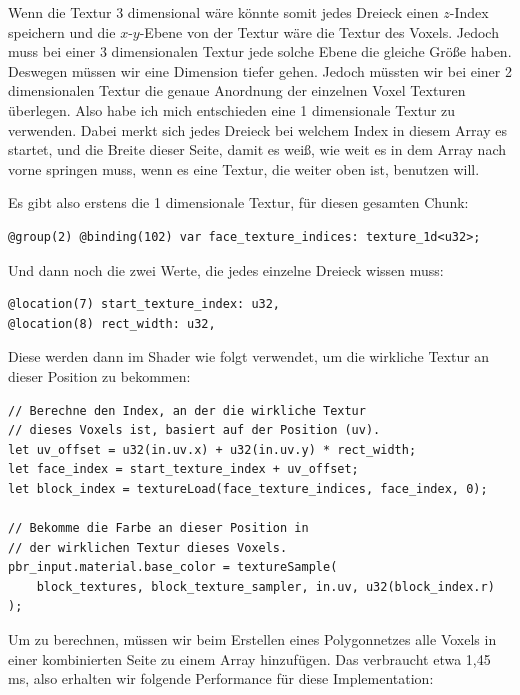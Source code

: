 Wenn die Textur 3 dimensional wäre könnte somit
jedes Dreieck einen $z$-Index speichern und die
$x$-$y$-Ebene von der Textur wäre die Textur des Voxels.
Jedoch muss bei einer 3 dimensionalen Textur jede
solche Ebene die gleiche Größe haben.
Deswegen müssen wir eine Dimension tiefer gehen.
Jedoch müssten wir bei einer 2 dimensionalen Textur
die genaue Anordnung der einzelnen Voxel Texturen
überlegen.
Also habe ich mich entschieden eine 1 dimensionale
Textur zu verwenden.
Dabei merkt sich jedes Dreieck bei welchem Index
in diesem Array es startet, und die Breite dieser
Seite, damit es weiß, wie weit es in dem Array nach
vorne springen muss, wenn es eine Textur, die weiter
oben ist, benutzen will.
 
Es gibt also erstens die 1 dimensionale Textur,
für diesen gesamten Chunk:

\begin{lstlisting}[language=WGSL]
@group(2) @binding(102) var face_texture_indices: texture_1d<u32>;
\end{lstlisting}

Und dann noch die zwei Werte, die jedes einzelne
Dreieck wissen muss:

\begin{lstlisting}[language=WGSL]
@location(7) start_texture_index: u32,
@location(8) rect_width: u32,
\end{lstlisting}

Diese werden dann im  Shader wie
folgt verwendet, um die wirkliche Textur an
dieser Position zu bekommen:

\begin{lstlisting}[language=WGSL]
// Berechne den Index, an der die wirkliche Textur
// dieses Voxels ist, basiert auf der Position (uv).
let uv_offset = u32(in.uv.x) + u32(in.uv.y) * rect_width;
let face_index = start_texture_index + uv_offset;
let block_index = textureLoad(face_texture_indices, face_index, 0);

// Bekomme die Farbe an dieser Position in
// der wirklichen Textur dieses Voxels.
pbr_input.material.base_color = textureSample(
	block_textures, block_texture_sampler, in.uv, u32(block_index.r)
);
\end{lstlisting}

Um  zu berechnen,
müssen wir beim Erstellen eines Polygonnetzes
alle Voxels in einer kombinierten Seite
zu einem Array hinzufügen.
Das verbraucht etwa 1,45 ms,
also erhalten wir folgende Performance für
diese Implementation:

